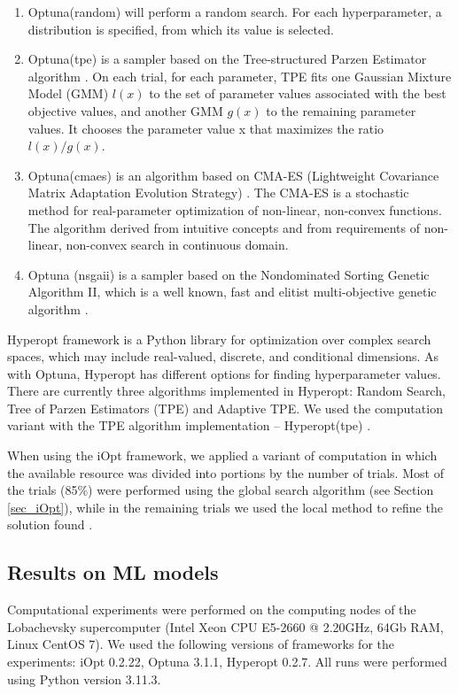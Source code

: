 \documentclass[iicol]{sn-jnl}
\theoremstyle{thmstyleone}%
\theoremstyle{thmstyletwo}%
\theoremstyle{thmstylethree}%
\begin{document}
\begin{enumerate}
	\item Optuna(random) will perform a random search. For each hyperparameter, a distribution is specified, from which its value is selected.
	\item Optuna(tpe) is a sampler based on the Tree-structured Parzen Estimator algorithm \citep{NIPS2011}. On each trial, for each parameter, TPE fits one Gaussian Mixture Model (GMM) $l(x)$ to the set of parameter values associated with the best objective values, and another GMM $g(x)$ to the remaining parameter values. It chooses the parameter value x that maximizes the ratio $l(x)/g(x)$.
	\item Optuna(cmaes) is an algorithm based on CMA-ES (Lightweight Covariance Matrix Adaptation Evolution Strategy) \citep{cmaes2015}. The CMA-ES is a stochastic method for real-parameter optimization of non-linear, non-convex functions. The algorithm derived from intuitive concepts and from requirements of non-linear, non-convex search in continuous domain.
	\item Optuna (nsgaii) is a sampler based on the Nondominated Sorting Genetic Algorithm II,  which is a well known, fast and elitist multi-objective genetic algorithm \citep{nsgaii2013}.
\end{enumerate}

Hyperopt framework is a Python library for optimization over complex search spaces, which may include real-valued, discrete, and conditional dimensions. As with Optuna, Hyperopt has different options for finding hyperparameter values. There are currently three algorithms implemented in Hyperopt: Random Search, Tree of Parzen Estimators (TPE) and Adaptive TPE. We used the computation variant with the TPE algorithm implementation -- Hyperopt(tpe) \citep{NIPS2011}.

When using the iOpt framework, we applied a variant of computation in which the available resource was divided into portions by the number of trials. Most of the trials (85\%) were performed using the global search algorithm (see Section \ref{sec_iOpt}), while in the remaining trials we used the local method to refine the solution found \citep{Kelley}.

\subsection{Results on ML models}

Computational experiments were performed on the computing nodes of the Lobachevsky supercomputer (Intel Xeon CPU E5-2660 @ 2.20GHz, 64Gb RAM, Linux CentOS 7). We used the following versions of frameworks for the experiments: iOpt 0.2.22, Optuna 3.1.1, Hyperopt 0.2.7. All runs were performed using Python version 3.11.3.
\end{document}
